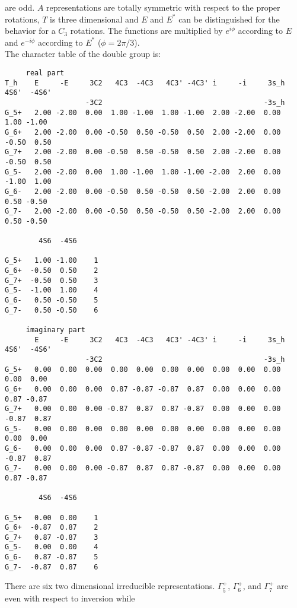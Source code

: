 \documentclass[12pt,a4paper]{article}
\begin{document}
are odd. $A$ representations are totally symmetric with respect to the proper 
rotations, $T$ is three dimensional and $E$ and $E^*$ can be distinguished for the 
behavior for a $C_3$ rotations. The functions are multiplied by
$e^{i\phi}$ according to $E$ and $e^{-i\phi}$ according to $E^*$
($\phi=2\pi/3$). \\
The character table of the double group is:
\begin{footnotesize}
\begin{verbatim}
     real part
T_h    E     -E     3C2   4C3  -4C3   4C3' -4C3' i     -i     3s_h 4S6'  -4S6'
                   -3C2                                      -3s_h            
G_5+   2.00 -2.00  0.00  1.00 -1.00  1.00 -1.00  2.00 -2.00  0.00  1.00 -1.00
G_6+   2.00 -2.00  0.00 -0.50  0.50 -0.50  0.50  2.00 -2.00  0.00 -0.50  0.50
G_7+   2.00 -2.00  0.00 -0.50  0.50 -0.50  0.50  2.00 -2.00  0.00 -0.50  0.50
G_5-   2.00 -2.00  0.00  1.00 -1.00  1.00 -1.00 -2.00  2.00  0.00 -1.00  1.00
G_6-   2.00 -2.00  0.00 -0.50  0.50 -0.50  0.50 -2.00  2.00  0.00  0.50 -0.50
G_7-   2.00 -2.00  0.00 -0.50  0.50 -0.50  0.50 -2.00  2.00  0.00  0.50 -0.50

        4S6  -4S6 
                  
G_5+   1.00 -1.00    1
G_6+  -0.50  0.50    2
G_7+  -0.50  0.50    3
G_5-  -1.00  1.00    4
G_6-   0.50 -0.50    5
G_7-   0.50 -0.50    6

     imaginary part
       E     -E     3C2   4C3  -4C3   4C3' -4C3' i     -i     3s_h 4S6'  -4S6'
                   -3C2                                      -3s_h            
G_5+   0.00  0.00  0.00  0.00  0.00  0.00  0.00  0.00  0.00  0.00  0.00  0.00
G_6+   0.00  0.00  0.00  0.87 -0.87 -0.87  0.87  0.00  0.00  0.00  0.87 -0.87
G_7+   0.00  0.00  0.00 -0.87  0.87  0.87 -0.87  0.00  0.00  0.00 -0.87  0.87
G_5-   0.00  0.00  0.00  0.00  0.00  0.00  0.00  0.00  0.00  0.00  0.00  0.00
G_6-   0.00  0.00  0.00  0.87 -0.87 -0.87  0.87  0.00  0.00  0.00 -0.87  0.87
G_7-   0.00  0.00  0.00 -0.87  0.87  0.87 -0.87  0.00  0.00  0.00  0.87 -0.87

        4S6  -4S6 
                  
G_5+   0.00  0.00    1
G_6+  -0.87  0.87    2
G_7+   0.87 -0.87    3
G_5-   0.00  0.00    4
G_6-   0.87 -0.87    5
G_7-  -0.87  0.87    6
\end{verbatim}  
\end{footnotesize}
There are six two dimensional irreducible representations. $\Gamma_5^+$,
$\Gamma_6^+$, and $\Gamma_7^+$ are even with respect to inversion while
\end{document}
